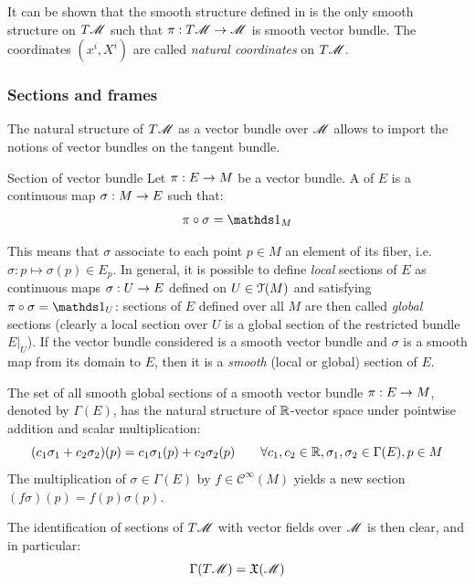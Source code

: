 It can be shown that the smooth structure defined in  is the only smooth structure on $ T\mathscr{M} $ such that $ \pi : T\mathscr{M} \rightarrow \mathscr{M} $ is smooth vector bundle. The coordinates $ (x^i , X^i) $ are called \emph{natural coordinates} on $ T\mathscr{M} $.

\subsubsection{Sections and frames}

The natural structure of $ T\mathscr{M} $ as a vector bundle over $ \mathscr{M} $ allows to import the notions of vector bundles on the tangent bundle.

\begin{definition}{Section of vector bundle}{}
  Let $ \pi : E \rightarrow M $ be a vector bundle. A  of $ E $ is a continuous map $ \sigma : M \rightarrow E $ such that:
  \begin{equation}
    \pi \circ \sigma = \id_M
  \end{equation}
\end{definition}

This means that $ \sigma $ associate to each point $ p \in M $ an element of its fiber, i.e. $ \sigma : p \mapsto \sigma(p) \in E_p $. In general, it is possible to define \emph{local} sections of $ E $ as continuous maps $ \sigma : U \rightarrow E $ defined on $ U \in \EuScript{T}(M) $ and satisfying $ \pi \circ \sigma = \id_U $: sections of $ E $ defined over all $ M $ are then called \emph{global} sections (clearly a local section over $ U $ is a global section of the restricted bundle $ E \vert_U $). If the vector bundle considered is a smooth vector bundle and $ \sigma $ is a smooth map from its domain to $ E $, then it is a \emph{smooth} (local or global) section of $ E $.

The set of all smooth global sections of a smooth vector bundle $ \pi : E \rightarrow M $, denoted by $ \Gamma(E) $, has the natural structure of $ \mathbb{R} $-vector space under pointwise addition and scalar multiplication:
\begin{equation*}
  (c_1 \sigma_1 + c_2 \sigma_2)(p) = c_1 \sigma_1(p) + c_2 \sigma_2(p)
  \qquad
  \forall c_1 , c_2 \in \mathbb{R} , \sigma_1 , \sigma_2 \in \Gamma(E) , p \in M
\end{equation*}
The multiplication of $ \sigma \in \Gamma(E) $ by $ f \in \mathcal{C}^\infty(M) $ yields a new section $ (f\sigma)(p) = f(p) \sigma(p) $.

The identification of sections of $ T\mathscr{M} $ with vector fields over $ \mathscr{M} $ is then clear, and in particular:
\begin{equation}
  \Gamma(T\mathscr{M}) = \mathfrak{X}(\mathscr{M})
\end{equation}

